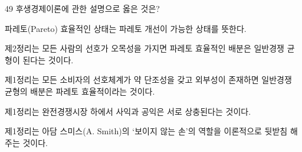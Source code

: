\begin{question}{49}
후생경제이론에 관한 설명으로 옳은 것은?
\begin{choices}
  \item 파레토(Pareto) 효율적인 상태는 파레토 개선이 가능한 상태를 뜻한다.
  \item 제2정리는 모든 사람의 선호가 오목성을 가지면 파레토 효율적인 배분은 일반경쟁 균형이 된다는 것이다.
  \item 제1정리는 모든 소비자의 선호체계가 약 단조성을 갖고 외부성이 존재하면 일반경쟁 균형의 배분은 파레토 효율적이라는 것이다.
  \item 제1정리는 완전경쟁시장 하에서 사익과 공익은 서로 상충된다는 것이다.
  \item 제1정리는 아담 스미스(A. Smith)의 ‘보이지 않는 손’의 역할을 이론적으로 뒷받침 해주는 것이다.
\end{choices}
\end{question}
